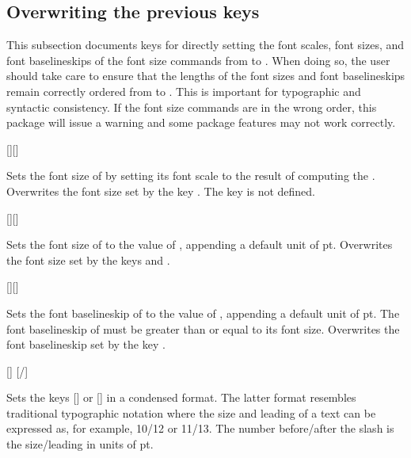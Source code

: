 \documentclass{beery}
\begin{document}
\subsection{Overwriting the previous keys}
\label{subsec:overwriting}

This subsection documents keys for directly setting the font scales, font sizes, and font baselineskips of the font size commands from  to .
When doing so, the user should take care to ensure that the lengths of the font sizes and font baselineskips remain correctly ordered from  to .
This is important for typographic and syntactic consistency.
If the font size commands are in the wrong order, this package will issue a warning and some package features may not work correctly.

[][]
\KeepNextPar*

Sets the font size of  by setting its font scale to the result of computing the .
Overwrites the font size set by the key .
The key  is not defined.

[][]
\KeepNextPar*

Sets the font size of  to the value of , appending a default unit of \unit{pt}.
Overwrites the font size set by the keys  and .

[][]
\KeepNextPar*

Sets the font baselineskip of  to the value of , appending a default unit of \unit{pt}.
The font baselineskip of  must be greater than or equal to its font size.
Overwrites the font baselineskip set by the key .

[]
\nopagebreak\newline
{}[/]

Sets the keys [] or [] in a condensed format.
The latter format resembles traditional typographic notation where the size and leading of a text can be expressed as, for example, \num{10}/\num{12} or \num{11}/\num{13}.
The number before\slash{}after the slash is the size\slash{}leading in units of \unit{pt}.
\end{document}
